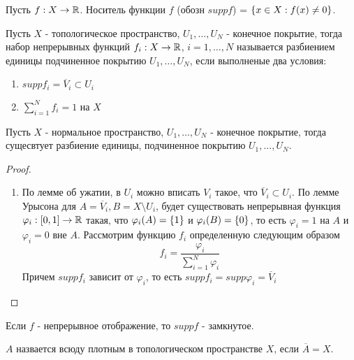 \begin{definition}
    Пусть $f: X \rightarrow \mathbb{R}$. Носитель функции $f$ (обозн $supp f$) = $\left\{x \in X : f(x) \neq 0\right\}$.
\end{definition}

\begin{definition}
    Пусть $X$ - топологическое пространство, $U_1, \ldots, U_N$ - конечное покрытие, тогда набор непрерывных функций $f_i: X \rightarrow \mathbb{R}$, $i = 1, \ldots, N$ называется разбиением единицы подчиненное покрытию $U_1, \ldots, U_N$, если выполненые два условия:
    \begin{enumerate}
        \item $supp f_i = \overline{V}_i \subset U_i$
        \item $\sum_{i = 1}^{N}f_i = 1$ на $X$
    \end{enumerate}
\end{definition}

\begin{theorem}
    Пусть $X$ - нормальное пространство, $U_1, \ldots, U_N$ - конечное покрытие, тогда сущесвтует разбиение единицы, подчиненное покрытию $U_1, \ldots, U_N$.
\end{theorem}
\begin{proof}
    \begin{enumerate}
        \item[] По лемме об ужатии, в $U_i$ можно вписать $V_i$ такое, что $\overline{V}_i \subset U_i$. По лемме Урысона для $A = \overline{V}_i, B = X \setminus U_i$, будет существовать непрерывная функция $\varphi_i: [0, 1] \rightarrow \mathbb{R}$ такая, что $\varphi_i(A) = \left\{1\right\}$ и $\varphi_i(B) = \left\{0\right\}$, то есть $\varphi_i = 1$ на $A$ и $\varphi_i = 0$ вне $A$.
        Рассмотрим функцию $f_i$ определенную следующим образом
        \[
            f_i = \frac{\varphi_i}{\sum_{i = 1}^{N}\varphi_i}
        \]
        Причем $supp f_i$ зависит от $\varphi_i$, то есть $supp f_i = supp \varphi_i = \overline{V}_i$
    \end{enumerate}
\end{proof}

\begin{exercise}
    Если $f$ - непрерывное отображение, то $supp f$ - замкнутое.
\end{exercise}

\begin{definition}
    $A$ назвается всюду плотным в топологическом пространстве $X$, если $\overline{A} = X$.
\end{definition}


